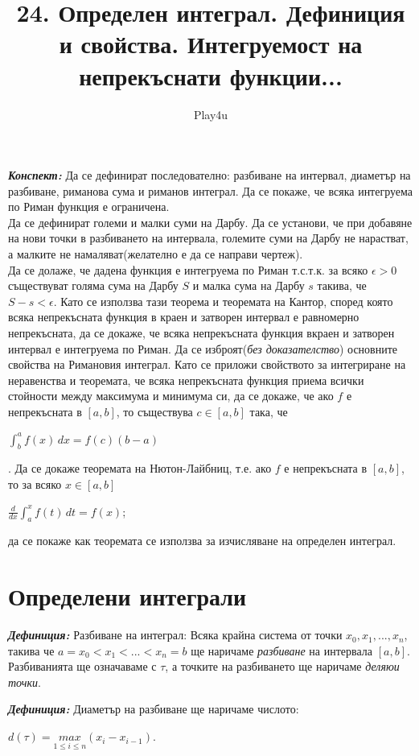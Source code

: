 \documentclass[11pt]{article} %
\title{24. Определен интеграл. Дефиниция и свойства. Интегруемост на непрекъснати функции...}
\author{Play4u}
\newcommand{\italicBold}[1]{\textbf{\emph{#1}}}
\newcommand{\definition}{\italicBold{Дефиниция: }}
\newcommand{\integral}[4]{\displaystyle \int_{#1}^{#2}#3\,#4}
\begin{document}
\maketitle

\italicBold{Конспект: } Да се дефинират последователно: разбиване на интервал, диаметър на разбиване, риманова сума и риманов интеграл. Да се покаже, че всяка интегруема по Риман функция е ограничена.\\
Да се дефинират големи и малки суми на Дарбу. Да се установи, че при добавяне на нови точки в разбиването на интервала, големите суми на Дарбу не нарастват, а малките не намаляват(желателно е да се направи чертеж).\\
Да се долаже, че дадена функция е интегруема по Риман т.с.т.к. за всяко $\epsilon > 0$ съществуват голяма сума на Дарбу $S$ и малка сума на Дарбу $s$ такива, че $S-s < \epsilon$. Като се използва тази теорема и теоремата на Кантор, според която всяка непрекъсната функция в краен и затворен интервал е равномерно непрекъсната, да се докаже, че всяка непрекъсната функция вкраен и затворен интервал е интегруема по Риман. Да се изброят(\textit{без доказателство}) основните свойства на Римановия интеграл. Като се приложи свойството за интегриране на неравенства и теоремата, че всяка непрекъсната функция приема всички стойности между максимума и минимума си, да се докаже, че ако $f$ е непрекъсната в $[a,b]$, то съществува $c \in [a,b]$ така, че \\
\centerline{$\displaystyle\int_{b}^{a}f(x)\,dx=f(c)(b-a)$}.
Да се докаже теоремата на Нютон-Лайбниц, т.е. ако $f$ е непрекъсната в $[a,b]$, то за всяко $x \in [a,b]$\\
\centerline{$\displaystyle\frac{d}{dx}\integral{a}{x}{f(t)}{dt}=f(x)$;}
да се покаже как теоремата се използва за изчисляване на определен интеграл.

\section{Определени интеграли}

\definition Разбиване на интеграл: Всяка крайна система от точки $x_{0}, x_{1},...,x_{n}$, такива че $a = x_{0} < x_{1} < ...< x_{n} = b$ ще наричаме \textit{разбиване} на интервала $[a,b]$. Разбиванията ще означаваме с $\tau$, а точките на разбиването ще наричаме \textit{деляюи точки}. \\\par

\definition Диаметър на разбиване ще наричаме числото:\\
\centerline{$d(\tau)=\underset{1\leq i\leq n}{max}(x_{i}-x_{i-1})$.}\\\par
\end{document}
